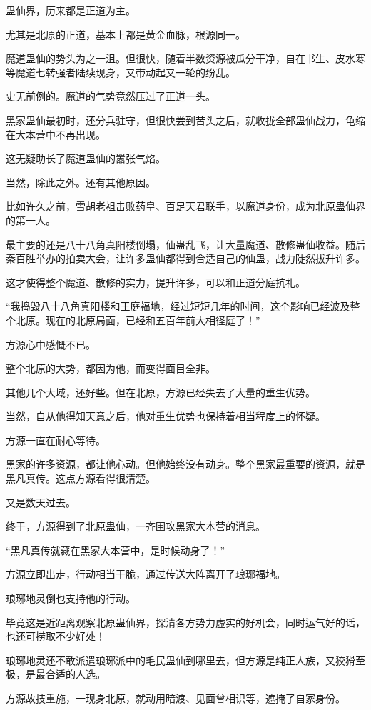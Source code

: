 \begin{this_body}
蛊仙界，历来都是正道为主。

尤其是北原的正道，基本上都是黄金血脉，根源同一。

魔道蛊仙的势头为之一沮。但很快，随着半数资源被瓜分干净，自在书生、皮水寒等魔道七转强者陆续现身，又带动起又一轮的纷乱。

史无前例的。魔道的气势竟然压过了正道一头。

黑家蛊仙最初时，还分兵驻守，但很快尝到苦头之后，就收拢全部蛊仙战力，龟缩在大本营中不再出现。

这无疑助长了魔道蛊仙的嚣张气焰。

当然，除此之外。还有其他原因。

比如许久之前，雪胡老祖击败药皇、百足天君联手，以魔道身份，成为北原蛊仙界的第一人。

最主要的还是八十八角真阳楼倒塌，仙蛊乱飞，让大量魔道、散修蛊仙收益。随后秦百胜举办的拍卖大会，让许多蛊仙都得到合适自己的仙蛊，战力陡然拔升许多。

这才使得整个魔道、散修的实力，提升许多，可以和正道分庭抗礼。

“我捣毁八十八角真阳楼和王庭福地，经过短短几年的时间，这个影响已经波及整个北原。现在的北原局面，已经和五百年前大相径庭了！”

方源心中感慨不已。

整个北原的大势，都因为他，而变得面目全非。

其他几个大域，还好些。但在北原，方源已经失去了大量的重生优势。

当然，自从他得知天意之后，他对重生优势也保持着相当程度上的怀疑。

方源一直在耐心等待。

黑家的许多资源，都让他心动。但他始终没有动身。整个黑家最重要的资源，就是黑凡真传。这点方源看得很清楚。

又是数天过去。

终于，方源得到了北原蛊仙，一齐围攻黑家大本营的消息。

“黑凡真传就藏在黑家大本营中，是时候动身了！”

方源立即出走，行动相当干脆，通过传送大阵离开了琅琊福地。

琅琊地灵倒也支持他的行动。

毕竟这是近距离观察北原蛊仙界，探清各方势力虚实的好机会，同时运气好的话，也还可捞取不少好处！

琅琊地灵还不敢派遣琅琊派中的毛民蛊仙到哪里去，但方源是纯正人族，又狡猾至极，是最合适的人选。

方源故技重施，一现身北原，就动用暗渡、见面曾相识等，遮掩了自家身份。


\end{this_body}

